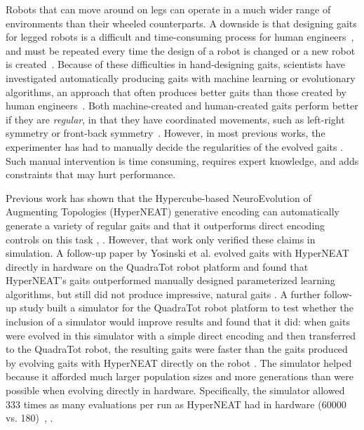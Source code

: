 Robots that can move around on legs can operate in a much wider range of environments than their wheeled counterparts. A downside is that designing gaits for legged robots is a difficult and time-consuming process for human engineers~\cite{strom1999legged,wettergreen1992gait}, and must be repeated every time the design of a robot is changed or a new robot is created~\cite{hornby1}. 
Because of these difficulties in hand-designing gaits, scientists have investigated automatically producing gaits with machine learning or evolutionary algorithms, an approach that often produces better gaits than those created by human engineers~\cite{valsalam:mii,kohl:stone,hornby1,hornby2,yos:clune}. Both machine-created and human-created gaits perform better if they are \emph{regular}, in that they have coordinated movements, such as left-right symmetry or front-back symmetry~\cite{valsalam:mii,clune2,clune1,clune3}.
However, in most previous works, the experimenter has had to manually decide the regularities of the evolved gaits \cite{valsalam:mii,tellez,beer,raibert} . 
Such manual intervention is time consuming, requires expert knowledge, and adds constraints that may hurt performance. 

Previous work has shown that the Hypercube-based NeuroEvolution of Augmenting Topologies (HyperNEAT) generative encoding \cite{stanley1} can automatically generate a variety of regular gaits and that it outperforms direct encoding controls on this task \cite{clune1}, \cite{clune2}. 
However, that work only verified these claims in simulation. 
A follow-up paper by Yosinski et al. evolved gaits with HyperNEAT directly in hardware on the QuadraTot robot platform and found that HyperNEAT's gaits outperformed manually designed parameterized learning algorithms, but still did not produce impressive, natural gaits \cite{yos:clune}. 
A further follow-up study built a simulator for the QuadraTot robot platform to test whether the inclusion of a simulator would improve results and found that it did:  when gaits were evolved in this simulator with a simple direct encoding and then transferred to the QuadraTot robot, the resulting gaits were faster than the gaits produced by evolving gaits with HyperNEAT directly on the robot \cite{glette}. 
The simulator helped because it afforded much larger population sizes and more generations than were possible when evolving directly in hardware. Specifically, the simulator allowed 333 times as many evaluations per run as HyperNEAT had in hardware (60000 vs. 180)~\cite{yos:clune}, \cite{glette}. 

